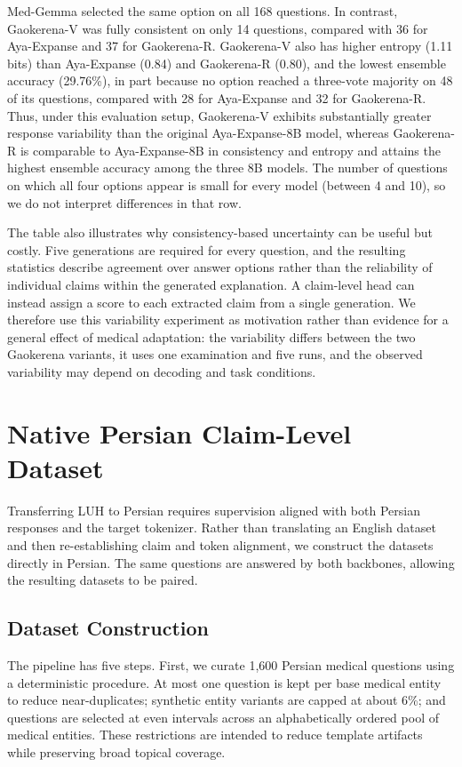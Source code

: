 \documentclass[conference]{IEEEtran}
\begin{document}
Med-Gemma selected the same option on all 168 questions. In contrast, Gaokerena-V was fully consistent on only 14 questions, compared with 36 for Aya-Expanse and 37 for Gaokerena-R. Gaokerena-V also has higher entropy (1.11 bits) than Aya-Expanse (0.84) and Gaokerena-R (0.80), and the lowest ensemble accuracy (29.76\%), in part because no option reached a three-vote majority on 48 of its questions, compared with 28 for Aya-Expanse and 32 for Gaokerena-R. Thus, under this evaluation setup, Gaokerena-V exhibits substantially greater response variability than the original Aya-Expanse-8B model, whereas Gaokerena-R is comparable to Aya-Expanse-8B in consistency and entropy and attains the highest ensemble accuracy among the three 8B models. The number of questions on which all four options appear is small for every model (between 4 and 10), so we do not interpret differences in that row.

The table also illustrates why consistency-based uncertainty can be useful but costly. Five generations are required for every question, and the resulting statistics describe agreement over answer options rather than the reliability of individual claims within the generated explanation. A claim-level head can instead assign a score to each extracted claim from a single generation. We therefore use this variability experiment as motivation rather than evidence for a general effect of medical adaptation: the variability differs between the two Gaokerena variants, it uses one examination and five runs, and the observed variability may depend on decoding and task conditions.

\section{Native Persian Claim-Level Dataset}

Transferring LUH to Persian requires supervision aligned with both Persian responses and the target tokenizer. Rather than translating an English dataset and then re-establishing claim and token alignment, we construct the datasets directly in Persian. The same questions are answered by both backbones, allowing the resulting datasets to be paired.

\subsection{Dataset Construction}

The pipeline has five steps. First, we curate 1,600 Persian medical questions using a deterministic procedure. At most one question is kept per base medical entity to reduce near-duplicates; synthetic entity variants are capped at about 6\%; and questions are selected at even intervals across an alphabetically ordered pool of medical entities. These restrictions are intended to reduce template artifacts while preserving broad topical coverage.
\end{document}
